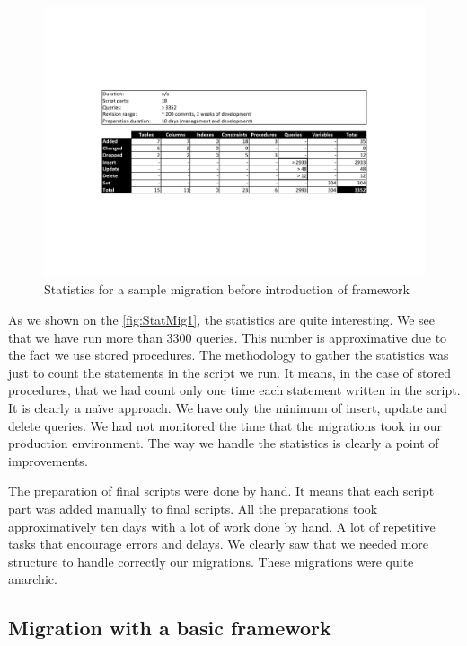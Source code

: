 \begin{figure}[h]
        \centering
        \includegraphics[scale=0.65]{images/Statistics_mig1.pdf}
        \caption{Statistics for a sample migration before introduction of framework}
        \label{fig:StatMig1}
\end{figure}

As we shown on the \autoref{fig:StatMig1}, the statistics are quite interesting. We see that we have run more than 3300 queries. This number is approximative due to the fact we use stored procedures. The methodology to gather the statistics was just to count the statements in the script we run. It means, in the case of stored procedures, that we had count only one time each statement written in the script. It is clearly a naïve approach. We have only the minimum of insert, update and delete queries. We had not monitored the time that the migrations took in our production environment. The way we handle the statistics is clearly a point of improvements. 

The preparation of final scripts were done by hand. It means that each script part was added manually to final scripts. All the preparations took approximatively ten days with a lot of work done by hand. A lot of repetitive tasks that encourage errors and delays. We clearly saw that we needed more structure to handle correctly our migrations. These migrations were quite anarchic.

\subsection{Migration with a basic framework}

